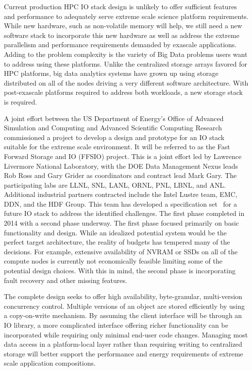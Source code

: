 \documentclass[conference]{IEEEtran} \pdfpagewidth=8.5in
\begin{document}
Current production HPC IO stack design is unlikely to offer sufficient features
and performance to adequately serve extreme scale science platform
requirements.  While new hardware, such as non-volatile memory will help, we
still need a new software stack to incorporate this new hardware as well as
address the extreme parallelism and performance requirements demanded by
exascale applications. Adding to the problem complexity is the variety of Big
Data problems users want to address using these platforms. Unlike the
centralized storage arrays favored for HPC platforms, big data analytics
systems have grown up using storage distributed on all of the nodes driving a
very different software architecture. With post-exascale platforms required to
address both workloads, a new storage stack is required.

A joint effort between the US Department of
Energy's Office of Advanced Simulation and Computing and Advanced Scientific
Computing Research commissioned a project to develop a design and prototype for
an IO stack suitable for the extreme scale environment. It will be referred to
as the Fast Forward Storage and IO (FFSIO) project. This is a joint effort led
by Lawrence Livermore National Laboratory, with the DOE Data Management Nexus
leads Rob Ross and Gary Grider as coordinators and contract lead Mark Gary. The
participating labs are LLNL, SNL, LANL, ORNL, PNL, LBNL, and ANL.  Additional
industrial partners contracted include the Intel Lustre team, EMC, DDN, and the
HDF Group. This team has developed a specification
set~\cite{fastforward:2014:docs} for a future IO stack to address the
identified challenges. The first phase completed in 2014 with a second phase
underway. The first phase focused primarily on basic
functionality and design. While an idealized potential system would be the
perfect target architecture, the reality of budgets has tempered many of the
decisions. For example, extensive availability of NVRAM or SSDs on all of the
compute nodes is currently not economically feasible limiting some of the
potential design choices.  With this in mind, the second phase is 
incorporating fault recovery and other missing features.

The complete design seeks to offer high availability, byte-granular,
multi-version concurrency control. Multiple versions of an object are stored
efficiently by using a copy-on-write mechanism. By assuming the client
interface will be through an IO library, a more complicated interface offering
richer functionality can be incorporated while requiring only minimal end-user
code changes.  Managing most data access in a platform-local layer rather than
requiring writing to centralized storage will better support the performance
and energy requirements of extreme scale application compositions.
\end{document}
